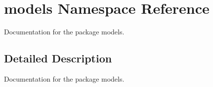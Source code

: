 \hypertarget{namespacemodels}{}\section{models Namespace Reference}
\label{namespacemodels}


Documentation for the package models.  




\subsection{Detailed Description}
Documentation for the package models. 